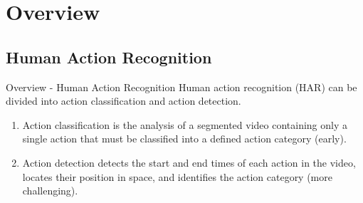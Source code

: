 \section{Overview}
\subsection{Human Action Recognition}
\begin{frame}{Overview - Human Action Recognition}
    Human action recognition (HAR) can be divided into action classification and action detection.

    \begin{enumerate}
        \item<1-> Action classification is the analysis of a segmented video containing only a single action that must be classified into a defined action category (early).
        \item<2-> Action detection detects the start and end times of each action in the video, locates their position in space, and identifies the action category (more challenging).
    \end{enumerate}


\end{frame}

